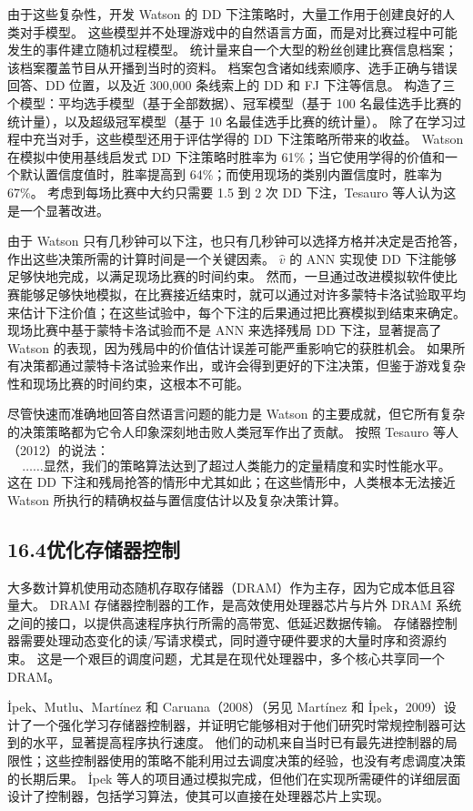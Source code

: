 \documentclass[UTF8, 12pt, fontset=fandol, oneside]{ctexart}
\begin{document}
由于这些复杂性，开发 Watson 的 DD 下注策略时，大量工作用于创建良好的人类对手模型。
这些模型并不处理游戏中的自然语言方面，而是对比赛过程中可能发生的事件建立随机过程模型。
统计量来自一个大型的粉丝创建比赛信息档案；该档案覆盖节目从开播到当时的资料。
档案包含诸如线索顺序、选手正确与错误回答、DD 位置，以及近 300,000 条线索上的 DD 和 FJ 下注等信息。
构造了三个模型：平均选手模型（基于全部数据）、冠军模型（基于 100 名最佳选手比赛的统计量），以及超级冠军模型（基于 10 名最佳选手比赛的统计量）。
除了在学习过程中充当对手，这些模型还用于评估学得的 DD 下注策略所带来的收益。
Watson 在模拟中使用基线启发式 DD 下注策略时胜率为 61\%；当它使用学得的价值和一个默认置信度值时，胜率提高到 64\%；而使用现场的类别内置信度时，胜率为 67\%。
考虑到每场比赛中大约只需要 1.5 到 2 次 DD 下注，Tesauro 等人认为这是一个显著改进。

由于 Watson 只有几秒钟可以下注，也只有几秒钟可以选择方格并决定是否抢答，作出这些决策所需的计算时间是一个关键因素。
$\hat v$ 的 ANN 实现使 DD 下注能够足够快地完成，以满足现场比赛的时间约束。
然而，一旦通过改进模拟软件使比赛能够足够快地模拟，在比赛接近结束时，就可以通过对许多蒙特卡洛试验取平均来估计下注价值；在这些试验中，每个下注的后果通过把比赛模拟到结束来确定。
现场比赛中基于蒙特卡洛试验而不是 ANN 来选择残局 DD 下注，显著提高了 Watson 的表现，因为残局中的价值估计误差可能严重影响它的获胜机会。
如果所有决策都通过蒙特卡洛试验来作出，或许会得到更好的下注决策，但鉴于游戏复杂性和现场比赛的时间约束，这根本不可能。

尽管快速而准确地回答自然语言问题的能力是 Watson 的主要成就，但它所有复杂的决策策略都为它令人印象深刻地击败人类冠军作出了贡献。
按照 Tesauro 等人（2012）的说法：
\[
\text{……显然，我们的策略算法达到了超过人类能力的定量精度和实时性能水平。}
\]
这在 DD 下注和残局抢答的情形中尤其如此；在这些情形中，人类根本无法接近 Watson 所执行的精确权益与置信度估计以及复杂决策计算。

\subsection*{16.4\quad 优化存储器控制}

大多数计算机使用动态随机存取存储器（DRAM）作为主存，因为它成本低且容量大。
DRAM 存储器控制器的工作，是高效使用处理器芯片与片外 DRAM 系统之间的接口，以提供高速程序执行所需的高带宽、低延迟数据传输。
存储器控制器需要处理动态变化的读/写请求模式，同时遵守硬件要求的大量时序和资源约束。
这是一个艰巨的调度问题，尤其是在现代处理器中，多个核心共享同一个 DRAM。

\.{I}pek、Mutlu、Mart\'inez 和 Caruana（2008）（另见 Mart\'inez 和 \.{I}pek，2009）设计了一个强化学习存储器控制器，并证明它能够相对于他们研究时常规控制器可达到的水平，显著提高程序执行速度。
他们的动机来自当时已有最先进控制器的局限性；这些控制器使用的策略不能利用过去调度决策的经验，也没有考虑调度决策的长期后果。
\.{I}pek 等人的项目通过模拟完成，但他们在实现所需硬件的详细层面设计了控制器，包括学习算法，使其可以直接在处理器芯片上实现。
\end{document}
